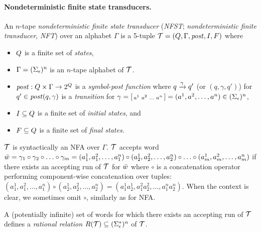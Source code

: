 \paragraph{Nondeterministic finite state transducers.}
An $n$-tape \emph{nondeterministic finite state transducer} (\emph{NFST}; \emph{nondeterministic finite transducer}, \emph{NFT}) over an alphabet $\Gamma$ is a 5-tuple $\mathcal{T} = (Q, \Gamma, \mathit{post}, I, F)$ where
\begin{itemize}
    \item $Q$ is a finite set of \emph{states},
    \item $\Gamma = (\Sigma_\epsilon)^n$ is an $n$-tape alphabet of $\mathcal{T}$.
    \item $\mathit{post}: Q \times \Gamma \rightarrow 2^{Q}$ is a \emph{symbol-post function} where ${q} \xrightarrow{{\gamma}} {q'}$ (or $(q, \gamma, q')$) for $q' \in \mathit{post}(q, \gamma)$ is a \emph{transition} for $\gamma = \begin{bsmallmatrix} a^1 & a^2 & \ldots & a^n\end{bsmallmatrix} = (a^1, a^2, \ldots, a^n) \in (\Sigma_\epsilon)^n$,
    \item $I \subseteq Q$ is a finite set of \emph{initial states}, and
    \item $F \subseteq Q$ is a finite set of \emph{final states}.
\end{itemize}

\nft $\mathcal{T}$ is syntactically an NFA over $\Gamma$.
$\mathcal{T}$ accepts word $\bar{{w}} = \gamma_1 \circ \gamma_2 \circ \ldots \circ \gamma_m = (a^1_1, a^2_1, \ldots, a^n_1) \circ (a^1_2, a^2_2, \ldots, a^n_2) \circ \ldots \circ (a^1_m, a^2_m, \ldots, a^n_m) $ if there exists an accepting run of $\mathcal{T}$ for $\bar{{w}}$ where $\circ$ is a concatenation operator performing component-wise concatenation over tuples: $(a^1_1, a^2_1, \ldots, a^n_1) \circ (a^1_2, a^2_2, \ldots, a^n_2) = (a^1_1a^1_2, a^2_1a^2_2, \ldots, a^n_1a^n_2)$.
When the context is clear, we sometimes omit $\circ$, similarly as for NFA.

A (potentially infinite) set of words for which there exists an accepting run of $\mathcal{T}$ defines a \emph{rational relation} $R(\mathcal{T}) \subseteq (\Sigma_\epsilon^*)^n$ of \nft $\mathcal{T}$.

